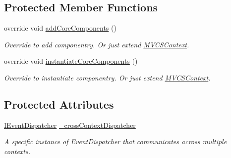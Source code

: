 \subsection*{Protected Member Functions}
\begin{DoxyCompactItemize}
\item 
\hypertarget{classstrange_1_1extensions_1_1context_1_1impl_1_1_cross_context_a93b6bb362ee0dd4e26f598667bb94c78}{override void \hyperlink{classstrange_1_1extensions_1_1context_1_1impl_1_1_cross_context_a93b6bb362ee0dd4e26f598667bb94c78}{add\-Core\-Components} ()}\label{classstrange_1_1extensions_1_1context_1_1impl_1_1_cross_context_a93b6bb362ee0dd4e26f598667bb94c78}

\begin{DoxyCompactList}\small\item\em Override to add componentry. Or just extend \hyperlink{classstrange_1_1extensions_1_1context_1_1impl_1_1_m_v_c_s_context}{M\-V\-C\-S\-Context}. \end{DoxyCompactList}\item 
\hypertarget{classstrange_1_1extensions_1_1context_1_1impl_1_1_cross_context_a0983ddcfb551f76e2a15660d24c93dd8}{override void \hyperlink{classstrange_1_1extensions_1_1context_1_1impl_1_1_cross_context_a0983ddcfb551f76e2a15660d24c93dd8}{instantiate\-Core\-Components} ()}\label{classstrange_1_1extensions_1_1context_1_1impl_1_1_cross_context_a0983ddcfb551f76e2a15660d24c93dd8}

\begin{DoxyCompactList}\small\item\em Override to instantiate componentry. Or just extend \hyperlink{classstrange_1_1extensions_1_1context_1_1impl_1_1_m_v_c_s_context}{M\-V\-C\-S\-Context}. \end{DoxyCompactList}\end{DoxyCompactItemize}
\subsection*{Protected Attributes}
\begin{DoxyCompactItemize}
\item 
\hyperlink{interfacestrange_1_1extensions_1_1dispatcher_1_1eventdispatcher_1_1api_1_1_i_event_dispatcher}{I\-Event\-Dispatcher} \hyperlink{classstrange_1_1extensions_1_1context_1_1impl_1_1_cross_context_a00c68512ad80d15236954614f223820e}{\-\_\-cross\-Context\-Dispatcher}
\begin{DoxyCompactList}\small\item\em A specific instance of Event\-Dispatcher that communicates across multiple contexts. \end{DoxyCompactList}\end{DoxyCompactItemize}
